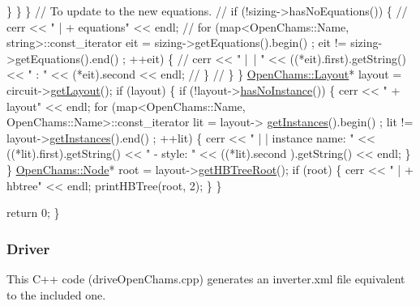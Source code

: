\begin{DoxyCodeInclude}
                \}
            \}
        \}
        \textcolor{comment}{// To update to the new equations.}
        \textcolor{comment}{// if (!sizing->hasNoEquations()) \{}
        \textcolor{comment}{//     cerr << " | + equations" << endl;}
        \textcolor{comment}{//     for (map<OpenChams::Name, string>::const\_iterator eit = sizing->getEquations().begin() ; eit
       != sizing->getEquations().end() ; ++eit) \{}
        \textcolor{comment}{//         cerr << " | | " << ((*eit).first).getString() << " : " << (*eit).second << endl;}
        \textcolor{comment}{//     \}}
        \textcolor{comment}{// \}}
    \}
    \hyperlink{class_open_chams_1_1_layout}{OpenChams::Layout}* layout = circuit->\hyperlink{class_open_chams_1_1_circuit_a403a908943f9a3e820fd25a86d00531d}{getLayout}();
    \textcolor{keywordflow}{if} (layout) \{
       \textcolor{keywordflow}{if} (!layout->\hyperlink{class_open_chams_1_1_layout_af27a31f10fcf22daa64f35c9c6bd2cda}{hasNoInstance}()) \{
          cerr << \textcolor{stringliteral}{" + layout"} << endl;
          \textcolor{keywordflow}{for} (map<OpenChams::Name, OpenChams::Name>::const\_iterator lit = layout->
      \hyperlink{class_open_chams_1_1_layout_ab0550a9050b7e788b2a18452c9df21f7}{getInstances}().begin() ; lit != layout->\hyperlink{class_open_chams_1_1_layout_ab0550a9050b7e788b2a18452c9df21f7}{getInstances}().end() ; ++lit) \{
             cerr << \textcolor{stringliteral}{" | | instance name: "} << ((*lit).first).getString() << \textcolor{stringliteral}{" - style: "} << ((*lit).second
      ).getString() << endl;
          \}
       \}
       \hyperlink{class_open_chams_1_1_node}{OpenChams::Node}* root = layout->\hyperlink{class_open_chams_1_1_layout_a13df4992219ef28a7dc014e9f5f0566a}{getHBTreeRoot}();
       \textcolor{keywordflow}{if} (root) \{
           cerr << \textcolor{stringliteral}{" | + hbtree"} << endl;
           printHBTree(root, 2);
       \}
    \}


    \textcolor{keywordflow}{return} 0;
\}

\end{DoxyCodeInclude}
\hypertarget{openchams_openChamsDriveC}{}\subsubsection{Driver}\label{openchams_openChamsDriveC}
This C++ code ({\ttfamily drive\+Open\+Chams.\+cpp}) generates an inverter.\+xml file equivalent to the included one. 
